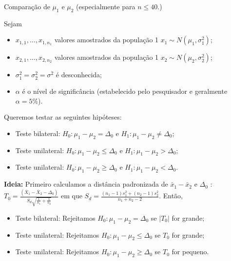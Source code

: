 \documentclass[9pt]{beamer}
\begin{document}
\begin{frame}{Comparação de $\mu_1$ e $\mu_2$ (especialmente para $n \leq 40$.)}

\small

Sejam
\begin{itemize}
	\item $x_{1,1}, \dots, x_{1, n_1}$ valores amostrados da população 1 $x_1 \sim N(\mu_1, \sigma_1^2)$;
	\item $x_{2,1}, \dots, x_{2, n_2}$ valores amostrados da população 1 $x_2 \sim N(\mu_2, \sigma_2^2)$;
	\item $\sigma_1^2=\sigma_2^2=\sigma^2$ é desconhecida;
	\item $\alpha$ é o nível de significância (estabelecido pelo pesquisador e geralmente $\alpha=5\%$). 
\end{itemize}
\vfill

Queremos testar as seguintes hipóteses:
\begin{itemize}
	\item Teste bilateral: $H_0: \mu_1 - \mu_2 = \Delta_0$ e $H_1: \mu_1 - \mu_2 \neq \Delta_0$;
	\item Teste unilateral: $H_0: \mu_1 - \mu_2 \leq \Delta_0$ e $H_1: \mu_1 - \mu_2 > \Delta_0$;
	\item Teste unilateral: $H_0: \mu_1 - \mu_2 \geq \Delta_0$ e $H_1: \mu_1 - \mu_2 < \Delta_0$.
\end{itemize}
\vfill

\textbf{Ideia:} Primeiro calculamos a distância padronizada de $\bar{x}_1 - \bar{x}_2$ e $\Delta_0$ : $T_0 = \frac{(\bar{X}_1 - \bar{X}_2 - \Delta_0)}{S_d\sqrt{ \frac{1}{n_1} + \frac{1}{n_2} }}$ em que $S_d = \frac{(n_1-1) s_1^2 + (n_2-1) s_2^2}{n_1+n_2-2}$. Então, 
\begin{itemize}
	\item Teste bilateral: Rejeitamos $H_0: \mu_1 - \mu_2 = \Delta_0$ se $\lvert T_0 \rvert$ for grande;
	\item Teste unilateral: Rejeitamos $H_0: \mu_1 - \mu_2 \leq \Delta_0$ se $T_0 $ for grande;
	\item Teste unilateral: Rejeitamos $H_0: \mu_1 - \mu_2 \geq \Delta_0$ se $T_0 $ for pequeno.
\end{itemize}

\normalsize
\end{frame}
\end{document}
